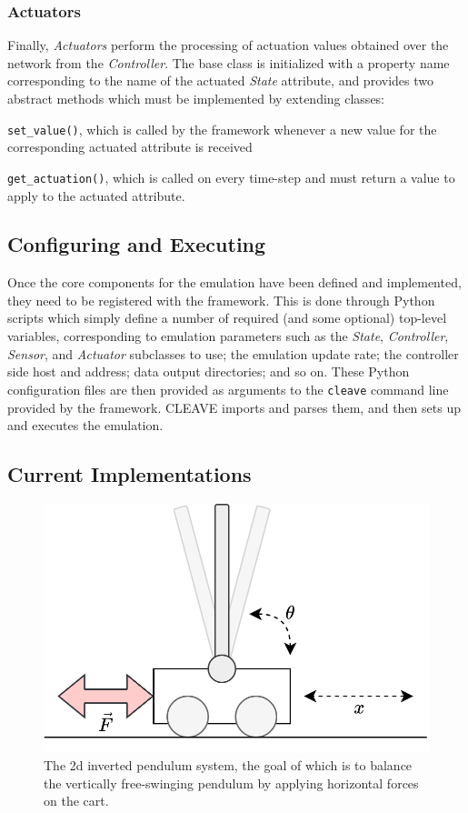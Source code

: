 \subsubsection{Actuators}

Finally, \emph{Actuators} perform the processing of actuation values obtained over the network from the \emph{Controller}.
The base class is initialized with a property name corresponding to the name of the actuated \emph{State} attribute, and provides two abstract methods which must be implemented by extending classes:
\begin{enumerate*}[itemjoin={{; }}, itemjoin*={{; and }}]
    \item \texttt{set_value()}, which is called by the framework whenever a new value for the corresponding actuated attribute is received
    \item \texttt{get_actuation()}, which is called on every time-step and must return a value to apply to the actuated attribute.
\end{enumerate*}

\subsection{Configuring and Executing }

Once the core components for the emulation have been defined and implemented, they need to be registered with the framework.
This is done through Python scripts which simply define a number of required (and some optional) top-level variables, corresponding to emulation parameters such as the \emph{State}, \emph{Controller}, \emph{Sensor}, and \emph{Actuator} subclasses to use; the emulation update rate; the controller side host and address; data output directories; and so on.
These Python configuration files are then provided as arguments to the \texttt{cleave} command line provided by the framework.
\ac{CLEAVE} imports and parses them, and then sets up and executes the emulation.

\subsection{Current Implementations}

\begin{figure}
    \centering
    \includegraphics[width=.7\columnwidth]{images/inverted_pendulum.png}
    \caption{
        The 2d inverted pendulum system, the goal of which is to balance the vertically free-swinging pendulum by applying horizontal forces on the cart.
    }\label{fig:invpend}
\end{figure}

